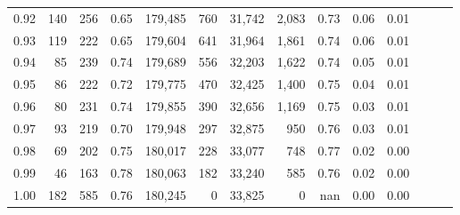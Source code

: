 \begin{tabular}{rrrrrrrrrrrrrr}
0.92 &    140 &  256 &  0.65 &  179,485 &      760 &  31,742 &   2,083 &  0.73 &  0.06 &      0.01 \\
0.93 &    119 &  222 &  0.65 &  179,604 &      641 &  31,964 &   1,861 &  0.74 &  0.06 &      0.01 \\
0.94 &     85 &  239 &  0.74 &  179,689 &      556 &  32,203 &   1,622 &  0.74 &  0.05 &      0.01 \\
0.95 &     86 &  222 &  0.72 &  179,775 &      470 &  32,425 &   1,400 &  0.75 &  0.04 &      0.01 \\
0.96 &     80 &  231 &  0.74 &  179,855 &      390 &  32,656 &   1,169 &  0.75 &  0.03 &      0.01 \\
0.97 &     93 &  219 &  0.70 &  179,948 &      297 &  32,875 &     950 &  0.76 &  0.03 &      0.01 \\
0.98 &     69 &  202 &  0.75 &  180,017 &      228 &  33,077 &     748 &  0.77 &  0.02 &      0.00 \\
0.99 &     46 &  163 &  0.78 &  180,063 &      182 &  33,240 &     585 &  0.76 &  0.02 &      0.00 \\
1.00 &    182 &  585 &  0.76 &  180,245 &        0 &  33,825 &       0 &   nan &  0.00 &      0.00 \\
\bottomrule
\end{tabular}
